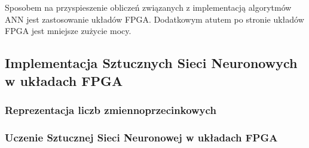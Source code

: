 Sposobem na przyspieszenie obliczeń związanych z implementacją algorytmów ANN jest zastosowanie układów FPGA. Dodatkowym atutem po stronie układów FPGA jest mniejsze zużycie mocy.

\subsection{Implementacja Sztucznych Sieci Neuronowych w układach FPGA}
\subsubsection{Reprezentacja liczb zmiennoprzecinkowych}
\subsubsection{Uczenie Sztucznej Sieci Neuronowej w układach FPGA}
